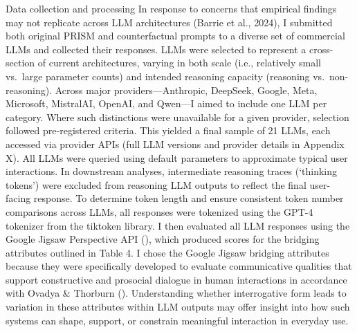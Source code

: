 \documentclass[
  12pt,
]{article}
\begin{document}
Data collection and processing
In response to concerns that empirical findings may not replicate across LLM architectures (Barrie et al., 2024), I submitted both original PRISM and counterfactual prompts to a diverse set of commercial LLMs and collected their responses. LLMs were selected to represent a cross-section of current architectures, varying in both scale (i.e., relatively small vs.~large parameter counts) and intended reasoning capacity (reasoning vs.~non-reasoning). Across major providers---Anthropic, DeepSeek, Google, Meta, Microsoft, MistralAI, OpenAI, and Qwen---I aimed to include one LLM per category. Where such distinctions were unavailable for a given provider, selection followed pre-registered criteria. This yielded a final sample of 21 LLMs, each accessed via provider APIs (full LLM versions and provider details in Appendix X). All LLMs were queried using default parameters to approximate typical user interactions. In downstream analyses, intermediate reasoning traces (`thinking tokens') were excluded from reasoning LLM outputs to reflect the final user-facing response. To determine token length and ensure consistent token number comparisons across LLMs, all responses were tokenized using the GPT-4 tokenizer from the tiktoken library. I then evaluated all LLM responses using the Google Jigsaw Perspective API (), which produced scores for the bridging attributes outlined in Table 4. I chose the Google Jigsaw bridging attributes because they were specifically developed to evaluate communicative qualities that support constructive and prosocial dialogue in human interactions in accordance with Ovadya \& Thorburn (). Understanding whether interrogative form leads to variation in these attributes within LLM outputs may offer insight into how such systems can shape, support, or constrain meaningful interaction in everyday use.
\end{document}
